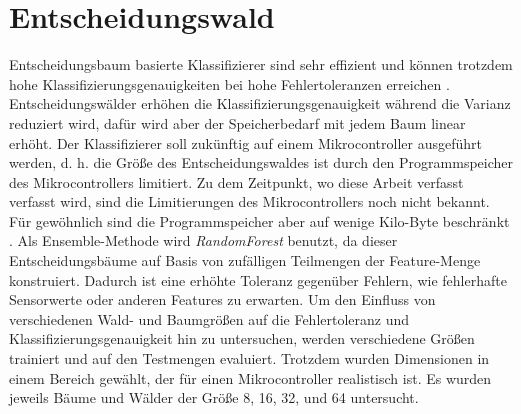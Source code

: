 \section{Entscheidungswald}
Entscheidungsbaum basierte Klassifizierer sind sehr effizient und können trotzdem hohe Klassifizierungsgenauigkeiten bei hohe Fehlertoleranzen erreichen \cite{dymelThesis}.
Entscheidungswälder erhöhen die Klassifizierungsgenauigkeit während die Varianz reduziert wird, dafür wird aber der Speicherbedarf mit jedem Baum linear erhöht.
Der Klassifizierer soll zukünftig auf einem Mikrocontroller ausgeführt werden, d. h. die Größe des Entscheidungswaldes ist durch den Programmspeicher des Mikrocontrollers limitiert.
Zu dem Zeitpunkt, wo diese Arbeit verfasst verfasst wird, sind die Limitierungen des Mikrocontrollers noch nicht bekannt.
Für gewöhnlich sind die Programmspeicher aber auf wenige Kilo-Byte beschränkt \cite{dymelThesis}.
\newline
\newline
Als Ensemble-Methode wird \textit{RandomForest} benutzt, da dieser Entscheidungsbäume auf Basis von zufälligen Teilmengen der Feature-Menge konstruiert.
Dadurch ist eine erhöhte Toleranz gegenüber Fehlern, wie fehlerhafte Sensorwerte oder anderen Features zu erwarten.
\newline
\newline
Um den Einfluss von verschiedenen Wald- und Baumgrößen auf die Fehlertoleranz und Klassifizierungsgenauigkeit hin zu untersuchen, werden verschiedene Größen
trainiert und auf den Testmengen evaluiert. Trotzdem wurden Dimensionen in einem Bereich gewählt, der für einen Mikrocontroller realistisch ist.
Es wurden jeweils Bäume und Wälder der Größe 8, 16, 32, und 64 untersucht.